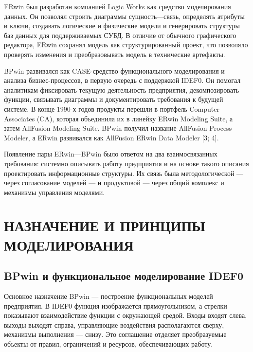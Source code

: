 \documentclass[essaypaper,paper]{pmk-graduate}
\begin{document}
ERwin был разработан компанией Logic Works как средство моделирования данных. Он позволял строить диаграммы сущность—связь, определять атрибуты и ключи, создавать логические и физические модели и генерировать структуры баз данных для поддерживаемых СУБД. В отличие от обычного графического редактора, ERwin сохранял модель как структурированный проект, что позволяло проверять изменения и преобразовывать модель в технические артефакты.

\par

BPwin развивался как CASE-средство функционального моделирования и анализа бизнес-процессов, в первую очередь с поддержкой IDEF0. Он помогал аналитикам фиксировать текущую деятельность предприятия, декомпозировать функции, связывать диаграммы и документировать требования к будущей системе. В конце 1990-х годов продукты перешли в портфель Computer Associates (CA), которая объединила их в линейку ERwin Modeling Suite, а затем AllFusion Modeling Suite. BPwin получил название AllFusion Process Modeler, а ERwin развивался как AllFusion ERwin Data Modeler [3; 4].

\par

Появление пары ERwin—BPwin было ответом на два взаимосвязанных требования: системно описывать работу предприятия и на основе такого описания проектировать информационные структуры. Их связь была методологической — через согласование моделей — и продуктовой — через общий комплекс и механизмы управления моделями.

\par

\chapter{НАЗНАЧЕНИЕ И ПРИНЦИПЫ МОДЕЛИРОВАНИЯ}

\section{BPwin и функциональное моделирование IDEF0}

Основное назначение BPwin — построение функциональных моделей предприятия. В IDEF0 функция изображается прямоугольником, а стрелки показывают взаимодействие функции с окружающей средой. Входы входят слева, выходы выходят справа, управляющие воздействия располагаются сверху, механизмы выполнения — снизу. Это соглашение отделяет преобразуемые объекты от правил, ограничений и ресурсов, обеспечивающих работу.
\end{document}
